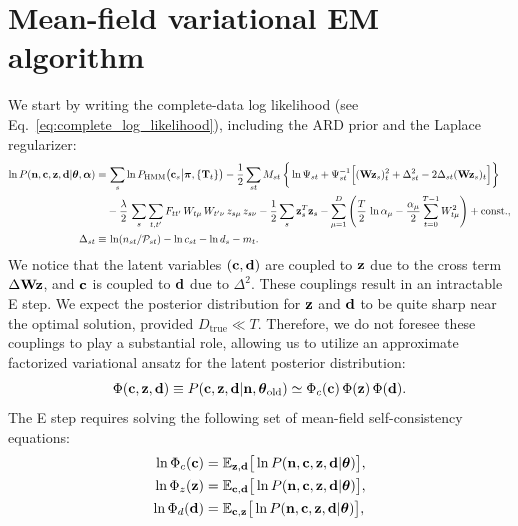 \documentclass[nofootinbib,amssymb,amsmath]{revtex4}
\newcommand{\vd}{{\bf d}}
\newcommand{\vc}{{\bf c}}
\newcommand{\vz}{{\bf z}}
\newcommand{\vn}{{\bf n}}
\newcommand{\vW}{{\bf W}}
\newcommand{\vtheta}{{\boldsymbol \theta}}
\newcommand{\vpi}{{\boldsymbol \pi}}
\newcommand{\valpha}{{\boldsymbol \alpha}}
\newcommand{\PP}{\mathcal{P}}
\newcommand{\EE}{\mathbb{E}}
\begin{document}
\section{Mean-field variational EM algorithm}
We start by writing the complete-data log likelihood (see Eq.~\ref{eq:complete_log_likelihood}), including the ARD prior and the Laplace regularizer:
\begin{subequations}
\begin{align}
\label{eq:complete_log_likelihood}
\ln P(\vn, \vc, \vz, \vd | \vtheta, \valpha) =&\, \sum_{s} \ln P_\mathrm{HMM}\big(\vc_s \big|\vpi, \{\mathbf{T}_t\}\big) - \frac{1}{2}\sum_{st} M_{st} \, \bigg\{\ln \Psi_{st} + \Psi_{st}^{-1}\Big[(\vW \vz_s)_t^2 + \Delta_{st}^2 - 2\Delta_{st} (\vW \vz_s)_t\Big]\bigg\}\nonumber\\
& - \frac{\lambda}{2} \, \sum_s \sum_{t,t'} F_{tt'} \, W_{t\mu} \, W_{t'\nu} \, z_{s\mu} \, z_{s\nu} - \frac{1}{2}\sum_{s} \vz_s^T \vz_s - \sum_{\mu=1}^{D}\left(\frac{T}{2} \, \ln \alpha_\mu -\frac{\alpha_\mu}{2} \sum_{t=0}^{T-1} W_{t\mu}^2  \right) + \mathrm{const.},\\
\label{eq:delta_def}
\Delta_{st} \equiv&\, \ln(n_{st}/\PP_{st}) - \ln c_{st} - \ln d_s - m_t.
\end{align}
\end{subequations}
We notice that the latent variables $(\vc, \vd)$ are coupled to $\vz$ due to the cross term $\Delta \vW \vz$, and $\vc$ is coupled to $\vd$ due to $\Delta^2$. These couplings result in an intractable E step. We expect the posterior distribution for $\vz$ and $\vd$ to be quite sharp near the optimal solution, provided $D_\mathrm{true} \ll T$. Therefore, we do not foresee these couplings to play a substantial role, allowing us to utilize an approximate factorized variational ansatz for the latent posterior distribution:
\begin{equation}
\Phi(\vc, \vz, \vd) \equiv P(\vc, \vz, \vd | \vn, \vtheta_\mathrm{old}) \simeq \Phi_c(\vc) \, \Phi(\vz) \, \Phi(\vd).
\end{equation}
The E step requires solving the following set of mean-field self-consistency equations:
\begin{subequations}
\begin{align}
\ln \Phi_c(\vc) &= \EE_{\vz, \vd}\big[\ln P(\vn, \vc, \vz, \vd | \vtheta)\big],\\
\ln \Phi_z(\vz) &= \EE_{\vc, \vd}\big[\ln P(\vn, \vc, \vz, \vd | \vtheta)\big],\\
\ln \Phi_d(\vd) &= \EE_{\vc, \vz}\big[\ln P(\vn, \vc, \vz, \vd | \vtheta)\big],
\end{align}
\end{subequations}
\end{document}
